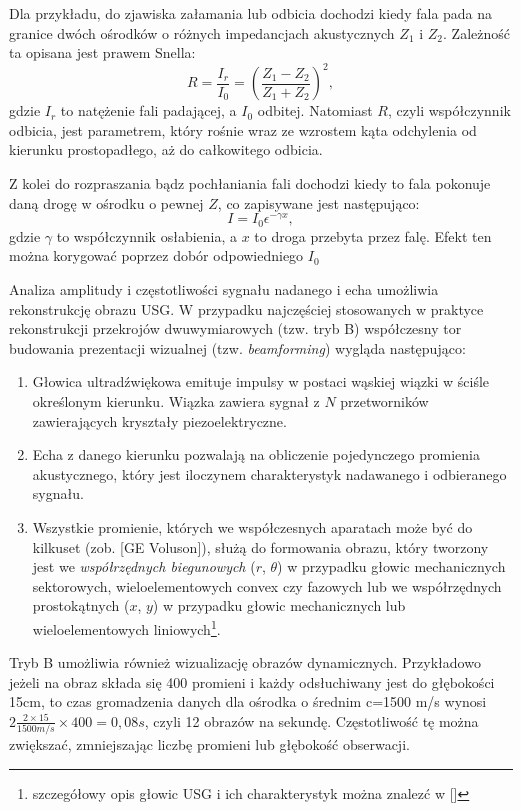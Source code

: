 Dla przykładu, do zjawiska załamania lub odbicia dochodzi kiedy fala pada na granice dwóch ośrodków o różnych impedancjach akustycznych $Z_1$ i $Z_2$. Zależność ta opisana jest prawem Snella:
\begin{equation}
R = \frac{I_r}{I_0} = \left(\frac{Z_1-Z_2}{Z_1+Z_2}\right)^2,
\end{equation}
gdzie $I_r$ to natężenie fali padającej, a $I_0$ odbitej. Natomiast $R$, czyli współczynnik odbicia, jest parametrem, który rośnie wraz ze wzrostem kąta odchylenia od kierunku prostopadłego, aż do całkowitego odbicia.

Z kolei do rozpraszania bądz pochłaniania fali dochodzi kiedy to fala pokonuje daną drogę w ośrodku o pewnej $Z$, co zapisywane jest następująco:
\begin{equation}
I=I_0 \epsilon^{-\gamma x},
\end{equation}
gdzie $\gamma$ to współczynnik osłabienia, a $x$ to droga przebyta przez falę. Efekt ten można korygować poprzez dobór odpowiedniego $I_0$

Analiza amplitudy i częstotliwości sygnału nadanego i echa umożliwia rekonstrukcję obrazu USG. W przypadku najczęściej stosowanych w praktyce rekonstrukcji przekrojów dwuwymiarowych (tzw. tryb B) współczesny tor budowania prezentacji wizualnej (tzw. \textit{beamforming}) wygląda następująco: 
\begin{enumerate}
	\item Głowica ultradźwiękowa emituje impulsy w postaci wąskiej wiązki w ściśle określonym kierunku. Wiązka zawiera sygnał z $N$ przetworników zawierających kryształy piezoelektryczne.
	\item Echa z danego kierunku pozwalają na obliczenie pojedynczego promienia akustycznego, który jest iloczynem charakterystyk nadawanego i odbieranego sygnału.
	\item Wszystkie promienie, których we współczesnych aparatach może być do kilkuset (zob. [GE Voluson]), służą do formowania obrazu, który tworzony jest we \textit{współrzędnych biegunowych} ($r$, $\theta$) w przypadku głowic mechanicznych sektorowych, wieloelementowych convex czy fazowych lub we współrzędnych prostokątnych ($x$, $y$) w przypadku głowic mechanicznych lub wieloelementowych liniowych\footnote{szczegółowy opis głowic USG i ich charakterystyk można znalezć w []}. 
\end{enumerate}

Tryb B umożliwia również wizualizację obrazów dynamicznych. Przykładowo jeżeli na obraz składa się 400 promieni i każdy odsłuchiwany jest do głębokości 15cm, to czas gromadzenia danych dla ośrodka o średnim c=1500 m/s wynosi $2\frac{2\times15}{1500 m/s}\times400 = 0,08 s$, czyli 12 obrazów na sekundę. Częstotliwość tę można zwiększać, zmniejszając liczbę promieni lub głębokość obserwacji.

